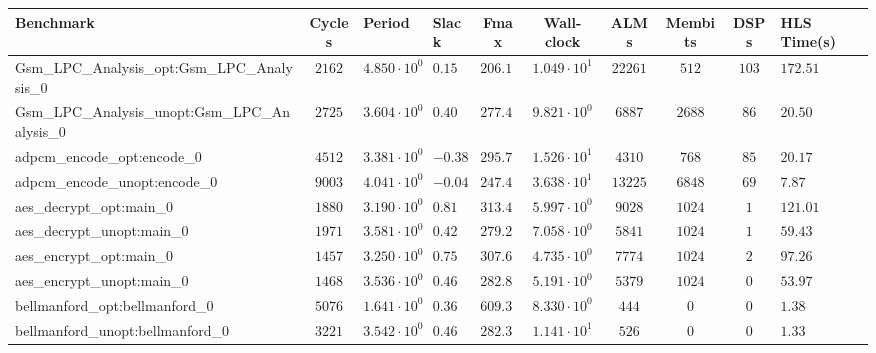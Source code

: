 \begin{tabular}{|l|c|HHc|c|c|c|cH|}
\hline
Benchmark                                       & Cycles       & Period                 & Slack     & Fmax       & Wall-clock              & ALMs       & Membits     & DSPs    & HLS Time(s) \\
\hline
Gsm\_LPC\_Analysis\_opt:Gsm\_LPC\_Analysis\_0   & $ 2162     $ & $ 4.850 \cdot 10^{0} $ & $ 0.15  $ & $ 206.19 $ & $ 1.049 \cdot 10^{1}  $ & $ 22261  $ & $ 512     $ & $ 103 $ & $ 172.51  $ \\
Gsm\_LPC\_Analysis\_unopt:Gsm\_LPC\_Analysis\_0 & $ 2725     $ & $ 3.604 \cdot 10^{0} $ & $ 0.40  $ & $ 277.47 $ & $ 9.821 \cdot 10^{0}  $ & $ 6887   $ & $ 2688    $ & $ 86  $ & $ 20.50   $ \\
adpcm\_encode\_opt:encode\_0                    & $ 4512     $ & $ 3.381 \cdot 10^{0} $ & $ -0.38 $ & $ 295.77 $ & $ 1.526 \cdot 10^{1}  $ & $ 4310   $ & $ 768     $ & $ 85  $ & $ 20.17   $ \\
adpcm\_encode\_unopt:encode\_0                  & $ 9003     $ & $ 4.041 \cdot 10^{0} $ & $ -0.04 $ & $ 247.46 $ & $ 3.638 \cdot 10^{1}  $ & $ 13225  $ & $ 6848    $ & $ 69  $ & $ 7.87    $ \\
aes\_decrypt\_opt:main\_0                       & $ 1880     $ & $ 3.190 \cdot 10^{0} $ & $ 0.81  $ & $ 313.48 $ & $ 5.997 \cdot 10^{0}  $ & $ 9028   $ & $ 1024    $ & $ 1   $ & $ 121.01  $ \\
aes\_decrypt\_unopt:main\_0                     & $ 1971     $ & $ 3.581 \cdot 10^{0} $ & $ 0.42  $ & $ 279.25 $ & $ 7.058 \cdot 10^{0}  $ & $ 5841   $ & $ 1024    $ & $ 1   $ & $ 59.43   $ \\
aes\_encrypt\_opt:main\_0                       & $ 1457     $ & $ 3.250 \cdot 10^{0} $ & $ 0.75  $ & $ 307.69 $ & $ 4.735 \cdot 10^{0}  $ & $ 7774   $ & $ 1024    $ & $ 2   $ & $ 97.26   $ \\
aes\_encrypt\_unopt:main\_0                     & $ 1468     $ & $ 3.536 \cdot 10^{0} $ & $ 0.46  $ & $ 282.81 $ & $ 5.191 \cdot 10^{0}  $ & $ 5379   $ & $ 1024    $ & $ 0   $ & $ 53.97   $ \\
bellmanford\_opt:bellmanford\_0                 & $ 5076     $ & $ 1.641 \cdot 10^{0} $ & $ 0.36  $ & $ 609.38 $ & $ 8.330 \cdot 10^{0}  $ & $ 444    $ & $ 0       $ & $ 0   $ & $ 1.38    $ \\
bellmanford\_unopt:bellmanford\_0               & $ 3221     $ & $ 3.542 \cdot 10^{0} $ & $ 0.46  $ & $ 282.33 $ & $ 1.141 \cdot 10^{1}  $ & $ 526    $ & $ 0       $ & $ 0   $ & $ 1.33    $ \\

\end{tabular}

